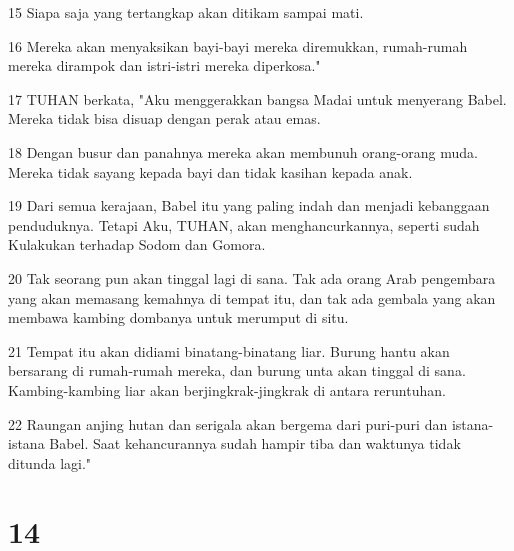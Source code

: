 \par 15 Siapa saja yang tertangkap akan ditikam sampai mati.
\par 16 Mereka akan menyaksikan bayi-bayi mereka diremukkan, rumah-rumah mereka dirampok dan istri-istri mereka diperkosa."
\par 17 TUHAN berkata, "Aku menggerakkan bangsa Madai untuk menyerang Babel. Mereka tidak bisa disuap dengan perak atau emas.
\par 18 Dengan busur dan panahnya mereka akan membunuh orang-orang muda. Mereka tidak sayang kepada bayi dan tidak kasihan kepada anak.
\par 19 Dari semua kerajaan, Babel itu yang paling indah dan menjadi kebanggaan penduduknya. Tetapi Aku, TUHAN, akan menghancurkannya, seperti sudah Kulakukan terhadap Sodom dan Gomora.
\par 20 Tak seorang pun akan tinggal lagi di sana. Tak ada orang Arab pengembara yang akan memasang kemahnya di tempat itu, dan tak ada gembala yang akan membawa kambing dombanya untuk merumput di situ.
\par 21 Tempat itu akan didiami binatang-binatang liar. Burung hantu akan bersarang di rumah-rumah mereka, dan burung unta akan tinggal di sana. Kambing-kambing liar akan berjingkrak-jingkrak di antara reruntuhan.
\par 22 Raungan anjing hutan dan serigala akan bergema dari puri-puri dan istana-istana Babel. Saat kehancurannya sudah hampir tiba dan waktunya tidak ditunda lagi."

\chapter{14}

